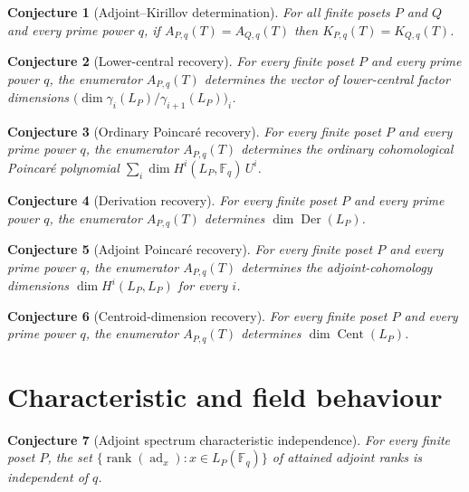 \documentclass[11pt]{article}
\newtheorem{conjecture}{Conjecture}
\theoremstyle{definition}
\newcommand{\rank}{\operatorname{rank}}
\newcommand{\Fq}{\mathbb F}
\begin{document}
\begin{conjecture}[Adjoint--Kirillov determination]\label{v1}
For all finite posets $P$ and $Q$ and every prime power $q$, if $A_{P,q}(T)=A_{Q,q}(T)$ then $K_{P,q}(T)=K_{Q,q}(T)$.
\end{conjecture}

\begin{conjecture}[Lower-central recovery]\label{v2}
For every finite poset $P$ and every prime power $q$, the enumerator $A_{P,q}(T)$ determines the vector of lower-central factor dimensions $\bigl(\dim\gamma_i(L_P)/\gamma_{i+1}(L_P)\bigr)_i$.
\end{conjecture}

\begin{conjecture}[Ordinary Poincar\'e recovery]\label{v3}
For every finite poset $P$ and every prime power $q$, the enumerator $A_{P,q}(T)$ determines the ordinary cohomological Poincar\'e polynomial $\sum_i\dim H^i(L_P,\Fq_q)\,U^i$.
\end{conjecture}

\begin{conjecture}[Derivation recovery]\label{v4}
For every finite poset $P$ and every prime power $q$, the enumerator $A_{P,q}(T)$ determines $\dim\operatorname{Der}(L_P)$.
\end{conjecture}

\begin{conjecture}[Adjoint Poincar\'e recovery]\label{v5}
For every finite poset $P$ and every prime power $q$, the enumerator $A_{P,q}(T)$ determines the adjoint-cohomology dimensions $\dim H^i(L_P,L_P)$ for every $i$.
\end{conjecture}

\begin{conjecture}[Centroid-dimension recovery]\label{v6}
For every finite poset $P$ and every prime power $q$, the enumerator $A_{P,q}(T)$ determines $\dim\operatorname{Cent}(L_P)$.
\end{conjecture}

\section{Characteristic and field behaviour}

\begin{conjecture}[Adjoint spectrum characteristic independence]\label{v7}
For every finite poset $P$, the set $\{\rank(\operatorname{ad}_x):x\in L_P(\Fq_q)\}$ of attained adjoint ranks is independent of $q$.
\end{conjecture}
\end{document}
